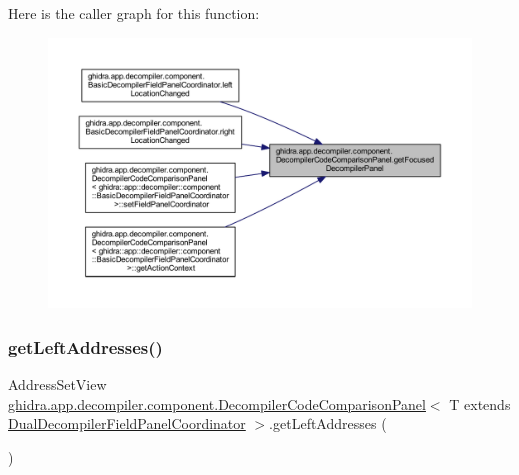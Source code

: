 Here is the caller graph for this function\+:
\nopagebreak
\begin{figure}[H]
\begin{center}
\leavevmode
\includegraphics[width=350pt]{classghidra_1_1app_1_1decompiler_1_1component_1_1_decompiler_code_comparison_panel_aaabbc5a2961a16da03848319bb139d27_icgraph}
\end{center}
\end{figure}
\mbox{\label{classghidra_1_1app_1_1decompiler_1_1component_1_1_decompiler_code_comparison_panel_ad2ba92b89dc9c58beeeeb7be5cfd1b4d}} 
\subsubsection{\texorpdfstring{getLeftAddresses()}{getLeftAddresses()}}
{\footnotesize\ttfamily Address\+Set\+View \mbox{\hyperlink{classghidra_1_1app_1_1decompiler_1_1component_1_1_decompiler_code_comparison_panel}{ghidra.\+app.\+decompiler.\+component.\+Decompiler\+Code\+Comparison\+Panel}}$<$ T extends \mbox{\hyperlink{classghidra_1_1app_1_1decompiler_1_1component_1_1_dual_decompiler_field_panel_coordinator}{Dual\+Decompiler\+Field\+Panel\+Coordinator}} $>$.get\+Left\+Addresses (\begin{DoxyParamCaption}{ }\end{DoxyParamCaption})\hspace{0.3cm}{\ttfamily [inline]}}



